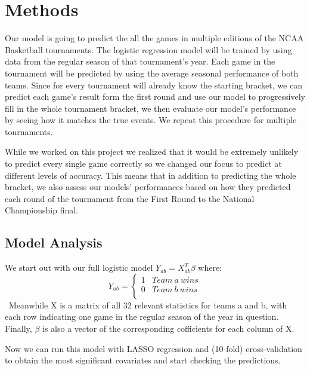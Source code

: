\documentclass{article} %
\begin{document}

\section{Methods}
\label{gen_inst}

Our model is going to predict the all the games in multiple editions of the NCAA Basketball tournaments. The logistic regression model will be trained by using data from the regular season of that tournament's year. Each game in the tournament will be predicted by using the average seasonal performance of both teams. Since for every tournament will already know the starting bracket, we can predict each game's result form the first round and use our model to progressively fill in the whole tournament bracket, we then evaluate our model's performance by seeing how it matches the true events. We repeat this procedure for multiple tournaments.

While we worked on this project we realized that it would be extremely unlikely to predict every single game correctly so we changed our focus to predict at different levels of accuracy. This means that in addition to predicting the whole bracket, we also assess our models' performances based on how they predicted each round of the tournament from the First Round to the National Championship final.




\subsection{Model Analysis}

We start out with our full logistic model $Y_{ab} = X_{ab}^T \beta$ where:\
\[ Y_{ab} = \left\{
  \begin{array}{ll}
  1 & Team \ a \ wins \\
  0 &  Team \ b \ wins \\
  \end{array} 
  \right. \]\
Meanwhile X is a matrix of all 32 relevant statistics for teams a and b, with each row indicating one game in the regular season of the year in question. Finally, $\beta$ is also a vector of the corresponding cofficients for each column of X.\

Now we can run this model with LASSO regression and (10-fold) cross-validation to obtain the most significant covariates and start checking the predictions.\
\end{document}
